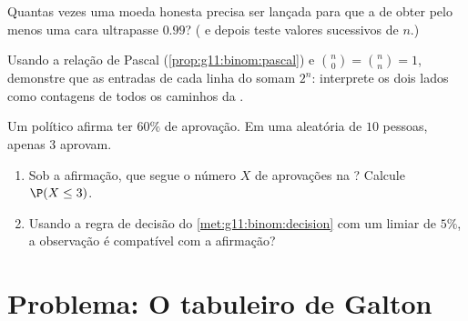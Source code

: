 \begin{exercise}[$\star\star$]\label{exo:g11:binom:9}
Quantas vezes uma moeda honesta precisa ser lançada para que a
 de obter pelo menos uma cara ultrapasse $0.99$?
( e depois teste valores sucessivos de $n$.)
\end{exercise}

\begin{exercise}[$\star\star$]\label{exo:g11:binom:10}
Usando a relação de Pascal (\cref{prop:g11:binom:pascal}) e
$\binom n0 = \binom nn = 1$, demonstre que as entradas de cada linha do
 somam $2^n$: interprete os dois lados como contagens
de todos os caminhos da .
\end{exercise}

\begin{exercise}[$\star\star\star$]\label{exo:g11:binom:11}
Um político afirma ter $60\%$ de aprovação. Em uma  aleatória de
$10$ pessoas, apenas $3$ aprovam.
\begin{enumerate}
  \item Sob a afirmação, que  segue o número $X$ de
        aprovações na ? Calcule $\P(X \leq 3)$.
  \item Usando a regra de decisão do \cref{met:g11:binom:decision} com um
        limiar de $5\%$, a observação é compatível com a afirmação?
\end{enumerate}
\end{exercise}

\section{Problema: O tabuleiro de Galton}


